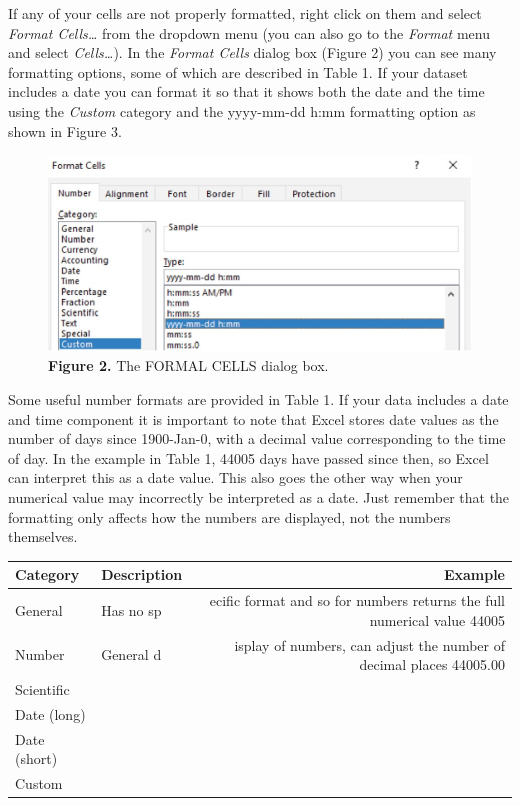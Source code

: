 \documentclass[
]{book}
\begin{document}
If any of your cells are not properly formatted, right click on them and select \emph{Format Cells\ldots{}} from the dropdown menu (you can also go to the \emph{Format} menu and select \emph{Cells\ldots{}}). In the \emph{Format Cells} dialog box (Figure 2) you can see many formatting options, some of which are described in Table 1. If your dataset includes a date you can format it so that it shows both the date and the time using the \emph{Custom} category and the yyyy-mm-dd h:mm formatting option as shown in Figure 3.

\begin{figure}
\centering
\includegraphics{images/Figure3.jpg}
\caption{\textbf{Figure 2.} The FORMAL CELLS dialog box.}
\end{figure}

Some useful number formats are provided in Table 1. If your data includes a date and time component it is important to note that Excel stores date values as the number of days since 1900-Jan-0, with a decimal value corresponding to the time of day. In the example in Table 1, 44005 days have passed since then, so Excel can interpret this as a date value. This also goes the other way when your numerical value may incorrectly be interpreted as a date. Just remember that the formatting only affects how the numbers are displayed, not the numbers themselves.

\begin{longtable}[]{@{}llr@{}}
\toprule
Category & Description & Example \\
\midrule
\endhead
General & Has no sp & ecific format and so for numbers returns the full numerical value 44005 \\
Number & General d & isplay of numbers, can adjust the number of decimal places 44005.00 \\
Scientific & & \\
Date (long) & & \\
Date (short) & & \\
Custom & & \\
\bottomrule
\end{longtable}
\end{document}
